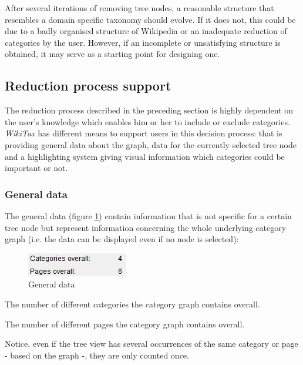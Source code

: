 \documentclass{scrartcl}
\begin{document}
After several iterations of removing tree nodes, a reasonable structure that resembles a domain specific taxonomy should evolve. If it does not, this could be due to a badly organised structure of Wikipedia or an inadequate reduction of categories by the user.  However, if an incomplete or unsatisfying structure is obtained, it may serve as a starting point for designing one.

\subsection{Reduction process support}
\label{sec:support}
The reduction process described in the preceding section is highly dependent on the user's knowledge which enables him or her to include or exclude categories. \emph{WikiTax} has different means to support users in this decision process: that is providing general data about the graph, data for the currently selected tree node and a highlighting system giving visual information which categories could be important or not.

\subsubsection{General data}

The general data (figure \ref{fig:general_data}) contain information that is not specific for a certain tree node but represent information concerning the whole underlying category graph (i.e. the data can be displayed even if no node is selected):

\begin{figure}[ht]
\centering
\includegraphics[scale=0.7]{figures/general_data.png}
\caption{General data}
\label{fig:general_data}
\end{figure}

\begin{description}
\small
\item[Categories overall] The number of different categories the category graph contains overall.
\item[Pages overall] The number of different pages the category graph contains overall.
\end{description}

Notice, even if the tree view has several occurrences of the same category or page - based on the graph -, they are only counted once.
\end{document}
